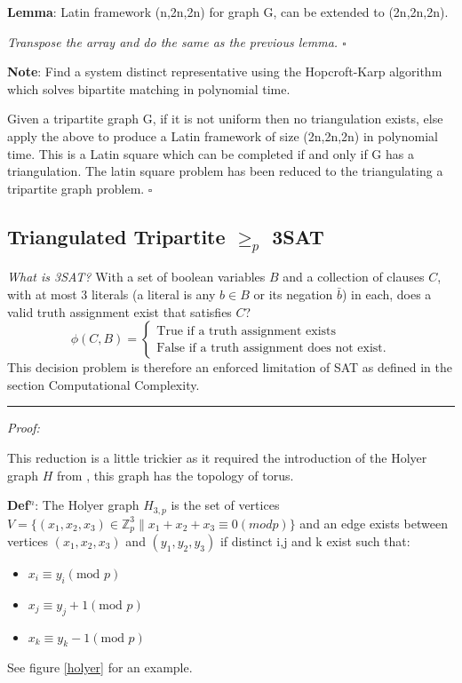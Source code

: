 \documentclass[a4paper,11pt]{report}
\newcounter{col}
\begin{document}
\textbf{Lemma}: Latin framework (n,2n,2n) for graph G, can be extended to (2n,2n,2n).

\textit{Transpose the array and do the same as the previous lemma. $\square$}

\textbf{Note}: Find a system distinct representative using the Hopcroft-Karp \cite{hopcroft} algorithm which solves bipartite matching in polynomial time. 

Given a tripartite graph G, if it is not uniform then no triangulation exists, else apply the above to produce a Latin framework of size (2n,2n,2n) in polynomial time. This is a Latin square which can be completed if and only if G has a triangulation. The latin square problem has been reduced to the triangulating a tripartite graph problem. $\square$

\subsection{Triangulated Tripartite $\geq_p$ 3SAT}

\textit{What is 3SAT?} With a set of boolean variables $B$ and a collection of clauses $C$, with at most 3 literals (a literal is any $b \in B$ or its negation $\bar{b}$) in each, does a valid truth assignment exist that satisfies $C$?
\begin{equation}
\phi (C,B) = \begin{cases}
\text{True if a truth assignment exists} \\
\text{False if a truth assignment does not exist}.
\end{cases}
\end{equation}
This decision problem is therefore an enforced limitation of SAT as defined in the section Computational Complexity.

\noindent\rule{4cm}{0.4pt}

\textit{Proof:}

This reduction is a little trickier as it required the introduction of the Holyer graph $H$ from \cite{holyer}, this graph has the topology of torus.

\textbf{Def$^n$}: The Holyer graph $H_{3,p}$ is the set of vertices $V=\{(x_1,x_2,x_3)\in \mathbb{Z}_p^3 \| x_1+x_2+x_3 \equiv 0 (mod p)\}$ and an edge exists between vertices $(x_1,x_2,x_3)$ and $(y_1,y_2,y_3)$ if distinct i,j and k exist such that:
\begin{itemize}
\item $x_i\equiv y_i (\text{mod }p)$
\item $x_j\equiv y_j+1 (\text{mod }p)$
\item $x_k\equiv y_k-1 (\text{mod }p)$
\end{itemize}
See figure \ref{holyer} for an example.
\end{document}
